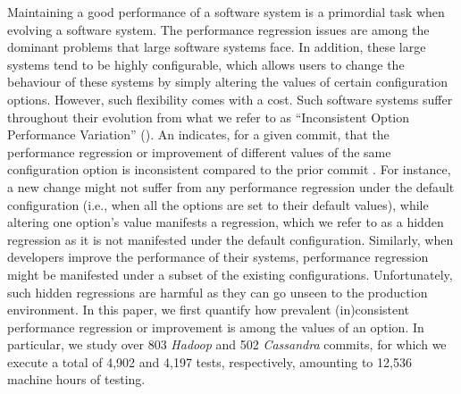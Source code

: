 Maintaining a good performance of a software system is a primordial task when evolving a software system. The performance regression issues are among the dominant problems that large software systems face. In addition, these large systems tend to be highly configurable, which allows users to change the behaviour of these systems by simply altering the values of certain configuration options. However, such flexibility comes with a cost. Such software systems suffer throughout their evolution from what we refer to as ``Inconsistent Option Performance Variation'' (\textbf{\inconsistent}). An \inconsistent indicates, for a given commit, that the performance regression or improvement of different values of the same configuration option is inconsistent compared to the prior commit%
. For instance, a new change might not suffer from any performance regression under the default configuration (i.e., when all the options are set to their default values), while altering one option's value manifests a regression, which we refer to as a hidden regression as it is not manifested under the default configuration. %
Similarly, when developers improve the performance of their systems, performance regression might be manifested under a subset of the existing configurations. %
Unfortunately, such hidden regressions are harmful as they can go unseen to the production environment. %
In this paper, we first quantify how prevalent (in)consistent performance regression or improvement is among the values of an option. %
In particular, we study over 803 \emph{Hadoop} and 502 \emph{Cassandra} commits, for which we execute a total of 4,902 and 4,197 tests, respectively, amounting to 12,536 machine hours of testing. %

